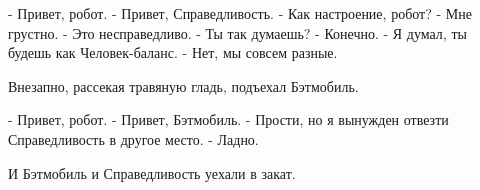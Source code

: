 - Привет, робот.
- Привет, Справедливость.
- Как настроение, робот?
- Мне грустно.
- Это несправедливо.
- Ты так думаешь?
- Конечно.
- Я думал, ты будешь как Человек-баланс.
- Нет, мы совсем разные.

Внезапно, рассекая травяную гладь, подъехал Бэтмобиль.

- Привет, робот.
- Привет, Бэтмобиль.
- Прости, но я вынужден отвезти Справедливость в другое место.
- Ладно.

И Бэтмобиль и Справедливость уехали в закат.